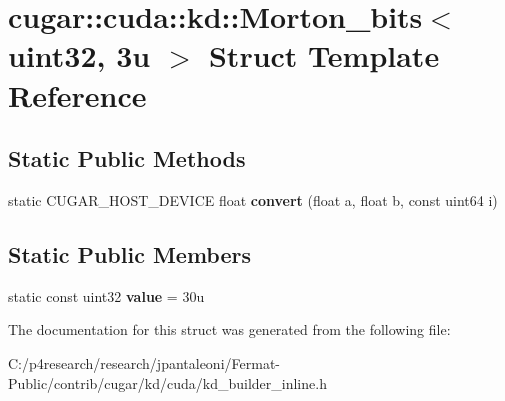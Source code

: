 \hypertarget{structcugar_1_1cuda_1_1kd_1_1_morton__bits_3_01uint32_00_013u_01_4}{}\section{cugar\+:\+:cuda\+:\+:kd\+:\+:Morton\+\_\+bits$<$ uint32, 3u $>$ Struct Template Reference}
\label{structcugar_1_1cuda_1_1kd_1_1_morton__bits_3_01uint32_00_013u_01_4}
\subsection*{Static Public Methods}
\begin{DoxyCompactItemize}
\item 
\mbox{\label{structcugar_1_1cuda_1_1kd_1_1_morton__bits_3_01uint32_00_013u_01_4_ae18e8ce5d46019d359775aa0305fcbf5}} 
static C\+U\+G\+A\+R\+\_\+\+H\+O\+S\+T\+\_\+\+D\+E\+V\+I\+CE float {\bfseries convert} (float a, float b, const uint64 i)
\end{DoxyCompactItemize}
\subsection*{Static Public Members}
\begin{DoxyCompactItemize}
\item 
\mbox{\label{structcugar_1_1cuda_1_1kd_1_1_morton__bits_3_01uint32_00_013u_01_4_a6487aa673caca85fd5cacbf445b517e5}} 
static const uint32 {\bfseries value} = 30u
\end{DoxyCompactItemize}


The documentation for this struct was generated from the following file\+:\begin{DoxyCompactItemize}
\item 
C\+:/p4research/research/jpantaleoni/\+Fermat-\/\+Public/contrib/cugar/kd/cuda/kd\+\_\+builder\+\_\+inline.\+h\end{DoxyCompactItemize}

